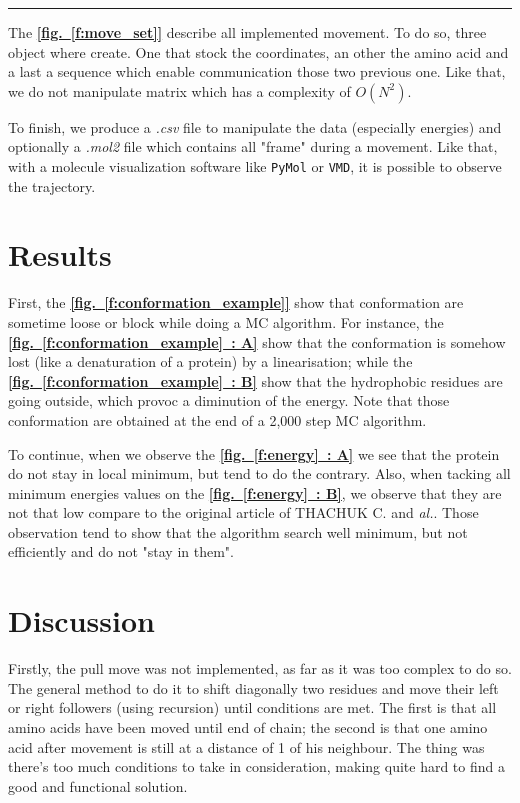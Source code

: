 \documentclass[12pt, oneside, a4paper]{report}
\newcommand{\fref}[1]{\hyperref[#1]{\textbf{[fig.~\ref*{#1}]}}}
\newcommand{\subfref}[2]{\hyperref[#1]{\textbf{[fig.~\ref*{#1}~: #2]}}}
\begin{document}
\begin{multicols}{2}
\begin{minipage}{\columnwidth}
    \small
    \vspace{0.5ex}
    \hrule height 1pt

\end{minipage}

The \fref{f:move_set} describe all implemented movement. To do so, three object where create. One that stock the coordinates, an other the amino acid and a last a sequence which enable communication those two previous one. Like that, we do not manipulate matrix which has a complexity of $O(N^2)$.

To finish, we produce a \textit{.csv} file to manipulate the data (especially energies) and optionally a \textit{.mol2} file which contains all "frame" during a movement. Like that, with a molecule visualization software like \texttt{PyMol} or \texttt{VMD}, it is possible to observe the trajectory.

\section{Results}
First, the \fref{f:conformation_example} show that conformation are sometime loose or block while doing a MC algorithm. For instance, the \subfref{f:conformation_example}{A} show that the conformation is somehow lost (like a denaturation of a protein) by a linearisation; while the \subfref{f:conformation_example}{B} show that the hydrophobic residues are going outside, which provoc a diminution of the energy. Note that those conformation are obtained at the end of a 2,000 step MC algorithm.

To continue, when we observe the \subfref{f:energy}{A} we see that the protein do not stay in local minimum, but tend to do the contrary. Also, when tacking all minimum energies values on the  \subfref{f:energy}{B}, we observe that they are not that low compare to the original article of THACHUK C. and \textit{al.}. Those observation tend to show that the algorithm search well minimum, but not efficiently and do not "stay in them".

\section{Discussion}
Firstly, the pull move was not implemented, as far as it was too complex to do so. The general method to do it to shift diagonally two residues and move their left or right followers (using recursion) until conditions are met. The first is that all amino acids have been moved until end of chain; the second is that one amino acid after movement is still at a distance of 1 of his neighbour. The thing was there's too much conditions to take in consideration, making quite hard to find a good and functional solution.


\end{multicols}
\end{document}
